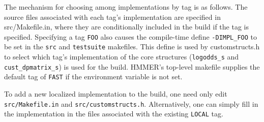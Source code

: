 \documentclass[letterpaper,10pt]{article}
\newcommand{\struct}[1]{\texttt{#1}}
\begin{document}
The mechanism for choosing among implementations by tag is as
follows.  The source files associated with each tag's implementation
are specified in src/Makefile.in, where they are conditionally
included in the build if the tag is specified.  Specifying a tag
\texttt{FOO} also causes the compile-time define \texttt{-DIMPL\_FOO}
to be set in the \texttt{src} and \texttt{testsuite} makefiles.  This
define is used by customstructs.h to select which tag's implementation
of the core structures (\struct{logodds\_s} and
\struct{cust\_dpmatrix\_s}) is used for the build.  HMMER's top-level
makefile supplies the default tag of \texttt{FAST} if the environment
variable is not set.

To add a new localized implementation to the build, one need only edit
\texttt{src/Makefile.in} and \texttt{src/customstructs.h}.
Alternatively, one can simply fill in the implementation in the files
associated with the existing \texttt{LOCAL} tag.
\end{document}
